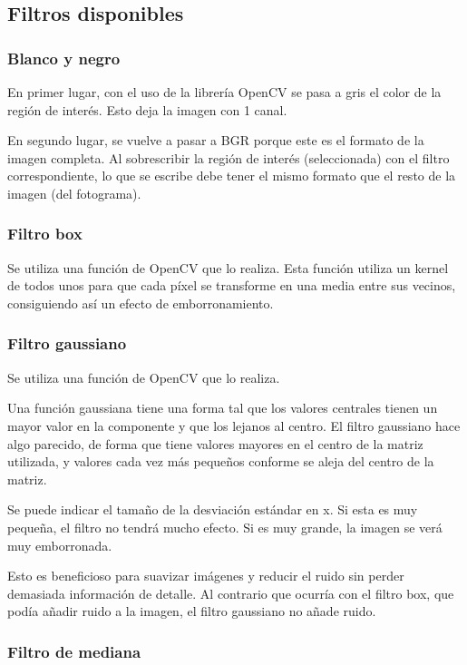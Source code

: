 \documentclass[12pt]{article}
\begin{document}
\subsection*{Filtros disponibles}

\subsubsection*{Blanco y negro}

En primer lugar, con el uso de la librería OpenCV se pasa a gris el color de la región de interés. Esto deja la imagen con 1 canal.

En segundo lugar, se vuelve a pasar a BGR porque este es el formato de la imagen completa. Al sobrescribir la región de interés (seleccionada) con el filtro correspondiente, lo que se escribe debe tener el mismo formato que el resto de la imagen (del fotograma).

\subsubsection*{Filtro box}

Se utiliza una función de OpenCV que lo realiza. Esta función utiliza un kernel de todos unos para que cada píxel se transforme en una media entre sus vecinos, consiguiendo así un efecto de emborronamiento.

\subsubsection*{Filtro gaussiano}

Se utiliza una función de OpenCV que lo realiza.

Una función gaussiana tiene una forma tal que los valores centrales tienen un mayor valor en la componente y que los lejanos al centro. El filtro gaussiano hace algo parecido, de forma que tiene valores mayores en el centro de la matriz utilizada, y valores cada vez más pequeños conforme se aleja del centro de la matriz.

Se puede indicar el tamaño de la desviación estándar en x. Si esta es muy pequeña, el filtro no tendrá mucho efecto. Si es muy grande, la imagen se verá muy emborronada.

Esto es beneficioso para suavizar imágenes y reducir el ruido sin perder demasiada información de detalle. Al contrario que ocurría con el filtro box, que podía añadir ruido a la imagen, el filtro gaussiano no añade ruido.

\subsubsection*{Filtro de mediana}
\end{document}
